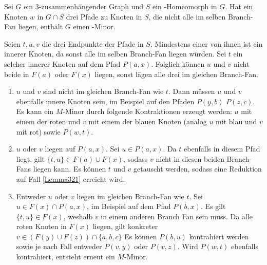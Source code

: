 \begin{lemma}\label{Lemma32}
  Sei $G$ ein $3$-zusammenhängender Graph und $S$ ein \kdd-Homeomorph in $G$.
  Hat ein Knoten $w$ in $G \cap S$ drei Pfade zu Knoten in $S$, die nicht alle im selben Branch-Fan liegen, enthält $G$ einen \kf-Minor.
\end{lemma}
\begin{beweis}
  Seien $t, u, v$ die drei Endpunkte der Pfade in $S$.
  Mindestens einer von ihnen ist ein innerer Knoten, da sonst alle im selben Branch-Fan liegen würden.
  Sei \oBdA $t$ ein solcher innerer Knoten auf dem Pfad $P(a, x)$.
  Folglich können $u$ und $v$ nicht beide in $F(a)$ oder $F(x)$ liegen, sonst lägen alle drei im gleichen Branch-Fan.
  \begin{enumerate}
    \item $u$ und $v$ sind nicht im gleichen Branch-Fan wie $t$. \label{Lemma321}
          Dann müssen $u$ und $v$ ebenfalls innere Knoten sein, im Beispiel auf den Pfaden $P(y, b)$ \bzw $P(z, c)$.
          Es kann ein $M$-Minor durch folgende Kontraktionen erzeugt werden: $u$ mit einem der roten und $v$ mit einem der blauen Knoten (analog $u$ mit blau und $v$ mit rot) sowie $P(w, t)$.
    \item $u$ oder $v$ liegen auf $P(a, x)$. \label{Lemma322}
          Sei \oBdA $u \in P(a, x)$.
          Da $t$ ebenfalls in diesem Pfad liegt, gilt $\{t, u\} \in F(a) \cup F(x)$, sodass $v$ nicht in diesen beiden Branch-Fans liegen kann.
          Es können $t$ und $v$ getauscht werden, sodass eine Reduktion auf Fall \ref{Lemma321} erreicht wird.
    \item Entweder $u$ oder $v$ liegen im gleichen Branch-Fan wie $t$. \label{Lemma323}
          Sei \oBdA $u \in F(x) \cap P(a, x)$, im Beispiel auf dem Pfad $P(b, x)$.
          Es gilt $\{t, u\} \in F(x)$, weshalb $v$ in einem anderen Branch Fan sein muss.
          Da alle roten Knoten in $F(x)$ liegen, gilt konkreter $v \in (F(y) \cup F(z)) \cap \{a, b, c\}$
          Es können $P(b, u)$ kontrahiert werden sowie je nach Fall entweder $P(v, y)$ oder $P(v, z)$.
          Wird $P(w, t)$ ebenfalls kontrahiert, entsteht erneut ein $M$-Minor.
  \end{enumerate}
\end{beweis}

